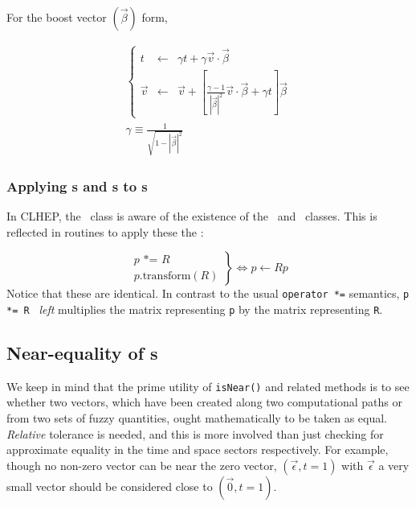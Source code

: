 For the boost vector  $(\vec{\beta})$ form,

\begin{eqnarray}
\label{eq:wboostvec}
  \left\{
  \begin{array}{lcl}
  t & \longleftarrow & \gamma t + \gamma \vec{v} \cdot \vec{\beta} \\
  \vec{v} & \longleftarrow & \vec{v} + \left[
	\frac{\gamma-1}{|\vec{\beta}|^2} \vec{v} \cdot \vec{\beta}  +
	\gamma t \right] \vec{\beta}
  \end{array}
  \right. \\
  \gamma \equiv \frac{1}{\sqrt{1-|\vec{\beta}|^2}} \nonumber
\end{eqnarray}

\subsubsection{Applying \protect\Ro s and \protect\LT s to \protect\SV s}

In CLHEP, the \LV\ class is aware of the existence of the \Ro\ and 
\LT\ classes.  
This is reflected in routines to apply these the \LV :

\begin{equation}
\label{eq:wopstareq}
\left.
\begin{array} {r}
p \mbox{ *= } R \\
p \mbox{.transform} (R) 
\end{array}
\right\}
\Longleftrightarrow
p \leftarrow R p
\end{equation}
\noindent
Notice that these are identical.
In contrast to the usual {\tt operator *=} semantics, 
{\tt p *= R } {\it left} multiplies the matrix representing {\tt p} 
by the matrix representing {\tt R}.

\subsection{Near-equality of \protect\LV s}

We keep in mind that the prime utility of {\tt isNear()} and related methods
is to see whether two vectors, which have been created along two computational
paths or from
two sets of fuzzy quantities, ought mathematically to be taken as equal.
{\em Relative} tolerance is needed,
and this is more involved than just
checking for approximate equality in the time and space sectors respectively.
For example, though no non-zero vector can be near the zero vector,
$(\vec{\epsilon},t=1)$ with $\vec{\epsilon}$ a very small vector
should be considered close to $(\vec{0},t=1)$.

